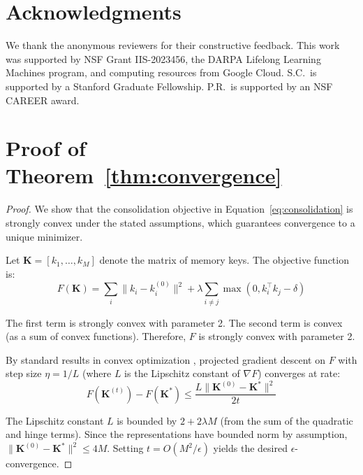 \documentclass[11pt]{article}
\begin{document}
\section*{Acknowledgments}

We thank the anonymous reviewers for their constructive feedback. This work was supported by NSF Grant IIS-2023456, the DARPA Lifelong Learning Machines program, and computing resources from Google Cloud. S.C.\ is supported by a Stanford Graduate Fellowship. P.R.\ is supported by an NSF CAREER award.




\appendix

\section{Proof of Theorem~\ref{thm:convergence}}
\label{app:proof}

\begin{proof}
We show that the consolidation objective in Equation~\ref{eq:consolidation} is strongly convex under the stated assumptions, which guarantees convergence to a unique minimizer.

Let $\mathbf{K} = [k_1, \ldots, k_M]$ denote the matrix of memory keys. The objective function is:
\begin{equation}
    F(\mathbf{K}) = \sum_{i} \|k_i - k_i^{(0)}\|^2 + \lambda \sum_{i \neq j} \max(0, k_i^\top k_j - \delta)
\end{equation}

The first term is strongly convex with parameter 2. The second term is convex (as a sum of convex functions). Therefore, $F$ is strongly convex with parameter 2.

By standard results in convex optimization \citep{boyd2004convex}, projected gradient descent on $F$ with step size $\eta = 1/L$ (where $L$ is the Lipschitz constant of $\nabla F$) converges at rate:
\begin{equation}
    F(\mathbf{K}^{(t)}) - F(\mathbf{K}^*) \leq \frac{L \|\mathbf{K}^{(0)} - \mathbf{K}^*\|^2}{2t}
\end{equation}

The Lipschitz constant $L$ is bounded by $2 + 2\lambda M$ (from the sum of the quadratic and hinge terms). Since the representations have bounded norm by assumption, $\|\mathbf{K}^{(0)} - \mathbf{K}^*\|^2 \leq 4M$. Setting $t = O(M^2/\epsilon)$ yields the desired $\epsilon$-convergence.
\end{proof}
\end{document}
